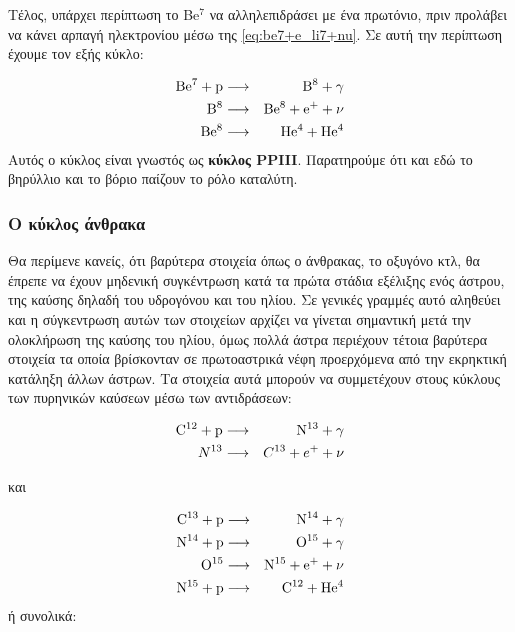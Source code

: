 Τέλος, υπάρχει περίπτωση το Be$^7$ να αλληλεπιδράσει με ένα πρωτόνιο, πριν προλάβει να κάνει αρπαγή ηλεκτρονίου μέσω της \eqref{eq:be7+e_li7+nu}. Σε αυτή την περίπτωση έχουμε τον εξής κύκλο:

\begin{eqnarray}
\rm Be^7 + p & \longrightarrow & \rm B^8 + \gamma \label{eq:be7+p_b8+gamma}\\
\rm B^8 & \longrightarrow & \rm Be^8 + e^{+} + \nu \label{eq:b8_be8+e+nu}\\
\rm Be^8 & \longrightarrow & \rm He^4 + He^4 \label{eq:be8_he4+he4}
\end{eqnarray}
Αυτός ο κύκλος είναι γνωστός ως \textbf{κύκλος PPIII}. Παρατηρούμε ότι και εδώ το βηρύλλιο και το βόριο παίζουν το ρόλο καταλύτη.
\subsubsection{Ο κύκλος άνθρακα}
Θα περίμενε κανείς, ότι βαρύτερα στοιχεία όπως ο άνθρακας, το οξυγόνο κτλ, θα έπρεπε να έχουν μηδενική συγκέντρωση κατά τα πρώτα στάδια εξέλιξης ενός άστρου, της καύσης δηλαδή του υδρογόνου και του ηλίου. Σε γενικές γραμμές αυτό αληθεύει και η σύγκεντρωση αυτών των στοιχείων αρχίζει να γίνεται σημαντική μετά την ολοκλήρωση της καύσης του ηλίου, όμως πολλά άστρα περιέχουν τέτοια βαρύτερα στοιχεία τα οποία βρίσκονταν σε πρωτοαστρικά νέφη προερχόμενα από την εκρηκτική κατάληξη άλλων άστρων. Τα στοιχεία αυτά μπορούν να συμμετέχουν στους κύκλους των πυρηνικών καύσεων μέσω των αντιδράσεων:

\begin{eqnarray}
\rm C^{12} + p & \longrightarrow & \rm N^{13} + \gamma \label{eq:c12+p_n13+gamma}\\
N^{13} & \longrightarrow & C^{13} + e^{+} + \nu \label{eq:n13_c13+e+nu}
\end{eqnarray}

και 

\begin{eqnarray}
\rm C^{13} + p & \longrightarrow & \rm N^{14} + \gamma \label{eq:c13+p_n14+gamma}\\
\rm N^{14} + p & \longrightarrow & \rm O^{15} + \gamma \label{eq:n14+p_o15+gamma}\\     
\rm O^{15} & \longrightarrow & \rm N^{15} + e^{+} + \nu \label{eq:o15_n15+e+nu}\\
\rm N^{15} + p & \longrightarrow & \rm C^{12} + He^4 \label{eq:n15+p_c12+he4}
\end{eqnarray}
ή συνολικά:

